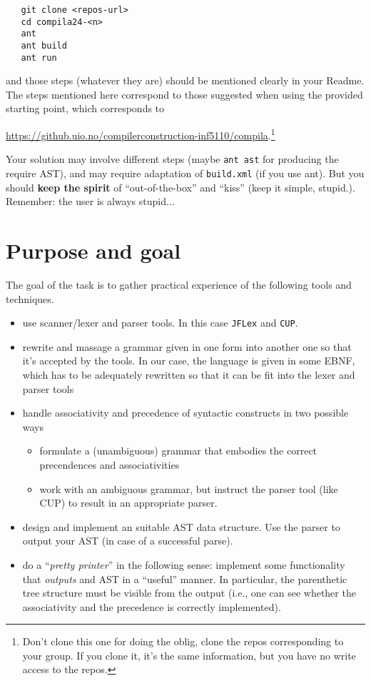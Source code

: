 \documentclass[10pt,freeform]{handout}[2014/08/13]
\begin{document}
\begin{verbatim}
   git clone <repos-url>
   cd compila24-<n>
   ant
   ant build
   ant run
\end{verbatim}
and those steps (whatever they are) should be mentioned clearly in your
Readme. The steps mentioned here correspond to those suggested when using
the provided starting point, which corresponds to
\begin{center}
  \url{https://github.uio.no/compilerconstruction-inf5110/compila}.\footnote{Don't
    clone this one for doing the oblig, clone the repos corresponding to
    your group. If you clone it, it's the same information, but you have no
    write access to the repos.}
\end{center}
Your solution may involve different steps (maybe \texttt{ant ast} for
producing the require AST), and may require adaptation of \texttt{build.xml}
(if you use ant). But you should \textbf{keep the spirit} of
``out-of-the-box'' and ``kiss'' (keep it simple, stupid.). Remember: the
user is always stupid...





\section{Purpose and goal}
\label{sec:x}

The goal of the task is to gather practical experience of the following
tools and techniques.
\begin{itemize}
\item use scanner/lexer and parser tools. In this case \texttt{JFLex} and
  \texttt{CUP}.
\item rewrite and massage a grammar given in one form into another one so
  that it's accepted by the tools. In our case, the language is given in
  some EBNF, which has to be adequately rewritten so that it can be fit
  into the lexer and parser tools
\item handle associativity and precedence of syntactic constructs in two
  possible ways
  \begin{itemize}
  \item formulate a (unambiguous) grammar that embodies the correct
    precendences and associativities
  \item work with an ambiguous grammar, but instruct the parser tool (like
    CUP) to result in an appropriate parser.
  \end{itemize}
\item design and implement an suitable AST data structure.  Use the parser
  to output your AST (in case of a successful parse).
\item do a ``\emph{pretty printer}'' in the following sense: implement some
  functionality that \emph{outputs} and AST in a ``useful'' manner. In
  particular, the parenthetic tree structure must be visible from the
  output (i.e., one can see whether the associativity and the precedence is
  correctly implemented). 
\end{itemize}
\end{document}
